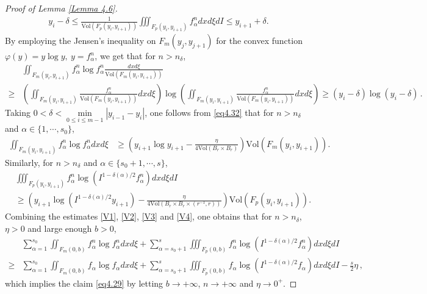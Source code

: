 \documentclass[reqno,11pt]{amsart}
\numberwithin{equation}{section}
\begin{document}
\begin{proof}[Proof of Lemma \ref{Lemma 4.6}]
\begin{equation}
\begin{aligned}
y_i -\delta \leq \tfrac{1}{\mathrm{Vol} (F_p (y_i, y_{i+1}))} \iiint_{F_p (y_i, y_{i+1})} f^n_\alpha dxd\xi d I \leq y_{i+1} + \delta.
\end{aligned}
	\end{equation}
By employing the Jensen's inequality on $F_m(y_j,y_{j+1})$ for the convex function $\varphi (y) = y \log y ,\ y = f^n_\alpha $, we get that for $n > n_\delta$,
	\begin{equation*}
		\begin{aligned}
			& \iint_{F_m (y_i, y_{i+1})} f^n_\alpha \log f^n_\alpha \tfrac{dxd\xi}{\mathrm{Vol} (F_m(y_i, y_{i+1}))} \\
			\geq & (\iint_{F_m (y_i, y_{i+1})} \tfrac{f^n_\alpha}{\mathrm{Vol} (F_m (y_i, y_{i+1}))} dxd\xi) \log (\iint_{F_m (y_i, y_{i+1})} \tfrac{f^n_\alpha}{\mathrm{Vol} (F_m(y_i, y_{i+1}))} dxd\xi) \geq (y_i - \delta) \log (y_i - \delta) \,.
		\end{aligned}
	\end{equation*}
Taking $0 < \delta < \min \limits_{0 \leq i \leq m-1} |y_{i-1} - y_i | $, one follows from \eqref{eq4.32} that for $n > n_\delta$ and $\alpha \in \{ 1, \cdots, s_0 \}$,
	\begin{equation}\label{V3}
		\begin{aligned}
			\iint_{F_m (y_i, y_{i+1})} f^n_\alpha \log f^n_\alpha dxd\xi 
			&\geq (y_{i+1} \log y_{i+1} - \tfrac{\eta }{4 \mathrm{Vol} (B_r \times B_r)})  \mathrm{Vol} (F_m(y_i, y_{i+1})).
		\end{aligned}
	\end{equation}
Similarly, for $n > n_\delta$ and $\alpha \in \{s_0 + 1, \cdots, s \}$,
\begin{equation}\label{V4}
		\begin{aligned}
			& \iiint_{F_p (y_i, y_{i+1})} f^n_\alpha \log ( I^{1 - \delta (\alpha) /2} f^n_\alpha ) dxd\xi d I \\
			&\geq (y_{i+1} \log ( I^{1 - \delta (\alpha) /2} y_{i+1} ) - \tfrac{\eta }{4 \mathrm{Vol} ( B_r \times B_r \times ( r^{-1}, r ) ) } ) \mathrm{Vol} (F_p(y_i, y_{i+1})).
		\end{aligned}
	\end{equation}
Combining the estimates \eqref{V1}, \eqref{V2}, \eqref{V3} and \eqref{V4}, one obtains that for $n>n_\delta$, $\eta > 0$ and large enough $b > 0$,
\begin{equation*}
\begin{aligned}
	& \sum_{\alpha = 1}^{s_0} \iint_{F_m (0,b)} f^n_\alpha \log f^n_\alpha dxd\xi + \sum_{\alpha = s_0 + 1}^{s} \iiint_{F_p (0, b)} f^n_\alpha \log ( I^{1 - \delta (\alpha) /2} f^n_\alpha ) dxd\xi d I \\
\geq & \sum_{\alpha = 1}^{s_0} \iint_{F_m (0,b)} f_\alpha \log f_\alpha dxd\xi + \sum_{\alpha = s_0 + 1}^{s} \iiint_{F_p (0, b)} f_\alpha \log ( I^{1 - \delta (\alpha) /2} f_\alpha ) dxd\xi d I - \tfrac{s}{2} \eta \,,
\end{aligned}
\end{equation*}
which implies the claim \eqref{eq4.29} by letting $b \to + \infty$, $n \to + \infty$ and $\eta \to 0^+$.


\end{proof}
\end{document}
